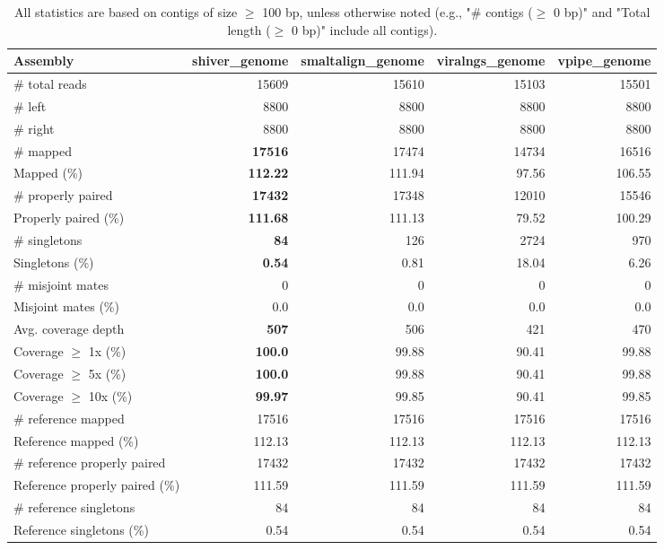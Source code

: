 \documentclass[12pt,a4paper]{article}
\begin{document}
\begin{table}[ht]
\begin{center}
\caption{All statistics are based on contigs of size $\geq$ 100 bp, unless otherwise noted (e.g., "\# contigs ($\geq$ 0 bp)" and "Total length ($\geq$ 0 bp)" include all contigs).}
\begin{tabular}{|l*{4}{|r}|}
\hline
Assembly & shiver\_genome & smaltalign\_genome & viralngs\_genome & vpipe\_genome \\ \hline
\# total reads & 15609 & 15610 & 15103 & 15501 \\ \hline
\# left & 8800 & 8800 & 8800 & 8800 \\ \hline
\# right & 8800 & 8800 & 8800 & 8800 \\ \hline
\# mapped & {\bf 17516} & 17474 & 14734 & 16516 \\ \hline
Mapped (\%) & {\bf 112.22} & 111.94 & 97.56 & 106.55 \\ \hline
\# properly paired & {\bf 17432} & 17348 & 12010 & 15546 \\ \hline
Properly paired (\%) & {\bf 111.68} & 111.13 & 79.52 & 100.29 \\ \hline
\# singletons & {\bf 84} & 126 & 2724 & 970 \\ \hline
Singletons (\%) & {\bf 0.54} & 0.81 & 18.04 & 6.26 \\ \hline
\# misjoint mates & 0 & 0 & 0 & 0 \\ \hline
Misjoint mates (\%) & 0.0 & 0.0 & 0.0 & 0.0 \\ \hline
Avg. coverage depth & {\bf 507} & 506 & 421 & 470 \\ \hline
Coverage $\geq$ 1x (\%) & {\bf 100.0} & 99.88 & 90.41 & 99.88 \\ \hline
Coverage $\geq$ 5x (\%) & {\bf 100.0} & 99.88 & 90.41 & 99.88 \\ \hline
Coverage $\geq$ 10x (\%) & {\bf 99.97} & 99.85 & 90.41 & 99.85 \\ \hline
\# reference mapped & 17516 & 17516 & 17516 & 17516 \\ \hline
Reference mapped (\%) & 112.13 & 112.13 & 112.13 & 112.13 \\ \hline
\# reference properly paired & 17432 & 17432 & 17432 & 17432 \\ \hline
Reference properly paired (\%) & 111.59 & 111.59 & 111.59 & 111.59 \\ \hline
\# reference singletons & 84 & 84 & 84 & 84 \\ \hline
Reference singletons (\%) & 0.54 & 0.54 & 0.54 & 0.54 \\ \hline

\end{tabular}
\end{center}
\end{table}
\end{document}
